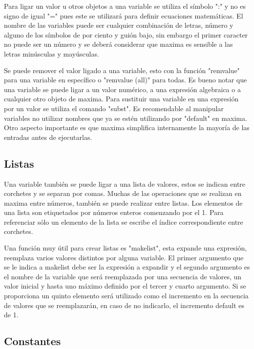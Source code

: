 \documentclass{article} %
\begin{document}
Para ligar un valor u otros objetos a una variable se utiliza el símbolo ":" y no es signo de igual "=" pues este se utilizará para definir ecuaciones matemáticas. El nombre de las variables puede ser cualquier combinación de letras, número y alguno de los símbolos de por ciento y guión bajo, sin embargo el primer caracter no puede ser un número y se deberá considerar que maxima es sensible a las letras minúsculas y mayúsculas. 

\vspace{0.5 cm}

Se puede remover el valor ligado a una variable, esto con la función "remvalue" para una variable en específico o "remvalue (all)" para todas. Es bueno notar que una variable se puede ligar a un valor numérico, a una expresión algebraica o a cualquier otro objeto de maxima. Para sustituir una variable en una expresión por un valor se utiliza el comando "subst". Es recomendable al manipular variables no utilizar nombres que ya se estén utilizando por "default" en maxima. Otro aspecto importante es que maxima simplifica internamente la mayoría de las entradas antes de ejecutarlas. 

\subsection{Listas}

Una variable también se puede ligar a una lista de valores, estos se indican entre corchetes y se separan por comas. Muchas de las operaciones que se realizan en maxima entre números, también se puede realizar entre listas. Los elementos de una lista son etiquetados por números enteros comenzando por el 1. Para referenciar sólo un elemento de la lista se escribe el índice correspondiente entre corchetes. 

\vspace{0.5 cm}

Una función muy útil para crear listas es "makelist", esta expande una expresión, reemplaza varios valores distintos por alguna variable. El primer argumento que se le indica a makelist debe ser la expresión a expandir y el segundo argumento es el nombre de la variable que será reemplazada por una secuencia de valores, un valor inicial y hasta uno máximo definido por el tercer y cuarto argumento. Si se proporciona un quinto elemento será utilizado como el incremento en la secuencia de valores que se reemplazarán, en caso de no indicarlo, el incremento default es de 1. 


\subsection{Constantes}
\end{document}
